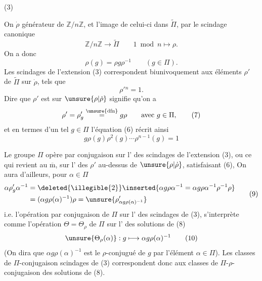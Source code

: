 (3) 

On  $\dot\rho$  générateur de $\mathbb Z/n\mathbb Z$, et   l'image de celui-ci dans $\widetilde\Pi$, par le scindage canonique 
\[
\mathbb Z/n\mathbb Z\longrightarrow\widetilde\Pi\qquad 1\bmod n\longmapsto\rho. \tag{4}
\]
On a donc
\[
\rho(g)=\rho g\rho^{-1}\qquad(g\in\Pi). \tag{5}
\]
Les scindages de l'extension (3) correspondent biunivoquement aux éléments $\rho'$ de $\widetilde\Pi$ sur $\dot\rho$, tels que
\[
\rho'{}^n=1. \tag{6}
\]
Dire que $\rho'$ est sur $\unsure{\rho|\dot\rho}$ signifie qu'on a
\[
\rho'=\rho'_g\overset{\unsure{\mathrm{dfn}}}{=}g\rho\qquad\text{avec }g\in\Pi, \tag{7}
\]
et en termes d'un tel $g\in\Pi$ l'équation (6)  récrit ainsi
\[
\boxed{g\rho(g)\rho^2(g)\cdots\rho^{n-1}(g)=1} \tag{8}
\]






Le groupe $\Pi$ opère par conjugaison sur l' des scindages de l'extension (3), ou ce qui revient au $\overline{\mathrm m}$, sur l' des $\rho'$ au-dessus de $\unsure{\rho|\dot\rho}$, satisfaisant (6),  On aura d'ailleurs, pour $\alpha\in\Pi$
\[
\begin{aligned}
\alpha\rho'_g\alpha^{-1}
&=\deleted{\illegible{2}}\inserted{\alpha g\rho\alpha^{-1}=\alpha g\rho\alpha^{-1}\rho^{-1}\rho}\\
&=(\alpha g\rho(\alpha)^{-1})\rho
=\unsure{\rho'_{\alpha g\rho(\alpha)^{-1}}}
\end{aligned}\tag{9}
\]
i.e. l'opération par conjugaison de $\Pi$ sur l' des scindages de (3), s'interprète comme l'opération $\Theta=\Theta_\rho$ de $\Pi$ sur l' des solutions de (8) 
\[
\unsure{\Theta_\rho(\alpha)}:g\longmapsto\alpha g\rho(\alpha)^{-1} \tag{10}
\]
(On dira que $\alpha g\rho(\alpha)^{-1}$ est le $\rho$-conjugué de $g$ par l'élément $\alpha\in\Pi$). Les classes de $\Pi$-conjugaison  scindages de (3) correspondent donc aux classes de $\Pi$-$\rho$-conjugaison des solutions de (8).

